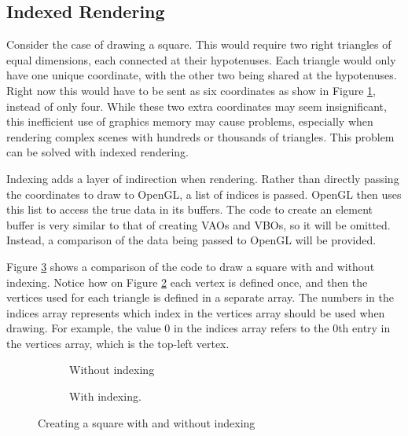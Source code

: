 \documentclass{article}
\begin{document}
\subsection{Indexed Rendering}
Consider the case of drawing a square. This would require two right triangles of equal dimensions, each connected at their hypotenuses. Each triangle would only have one unique coordinate, with the other two being shared at the hypotenuses. Right now this would have to be sent as six coordinates as show in Figure \ref{fig:square-coords}, instead of only four. While these two extra coordinates may seem insignificant, this inefficient use of graphics memory may cause problems, especially when rendering complex scenes with hundreds or thousands of triangles. This problem can be solved with indexed rendering.

Indexing adds a layer of indirection when rendering. Rather than directly passing the coordinates to draw to OpenGL, a list of indices is passed. OpenGL then uses this list to access the true data in its buffers. The code to create an element buffer is very similar to that of creating VAOs and VBOs, so it will be omitted. Instead, a comparison of the data being passed to OpenGL will be provided.

Figure \ref{fig:square-compare} shows a comparison of the code to draw a square with and without indexing. Notice how on Figure \ref{fig:square-indexed} each vertex is defined once, and then the vertices used for each triangle is defined in a separate array. The numbers in the indices array represents which index in the vertices array should be used when drawing. For example, the value 0 in the indices array refers to the 0th entry in the vertices array, which is the top-left vertex.

\begin{figure}[h]
    \centering
    \begin{subfigure}[h]{0.49\textwidth}
        
        \caption{Without indexing}
        \label{fig:square-coords}
    \end{subfigure}
    \begin{subfigure}[h]{0.49\textwidth}
        
        \caption{With indexing.}
        \label{fig:square-indexed}
    \end{subfigure}
	\caption{Creating a square with and without indexing}
	\label{fig:square-compare}
\end{figure}
\end{document}
